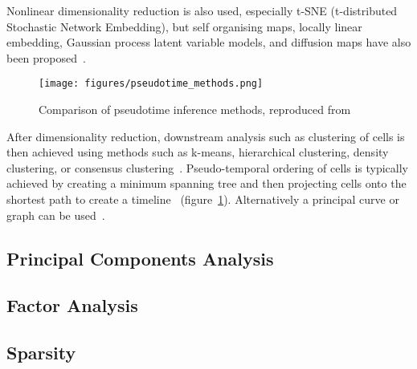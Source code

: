 Nonlinear dimensionality reduction is also used, especially t-SNE (t-distributed Stochastic Network Embedding), but self organising maps, locally linear embedding, Gaussian process latent variable models, and diffusion maps have also been proposed~\cite{Kim2015SingleCell,Welch2016SLICER,Haghverdi2015Diffusion,Campbell2015Bayesian}.

\begin{figure}[H]
	\centering
	\texttt{[image: figures/pseudotime\_methods.png]}
	\caption{Comparison of pseudotime inference methods, reproduced from~\cite{Cannoodt2016Computational}}
	\label{fig:pseudotime_methods}
\end{figure}

After dimensionality reduction, downstream analysis such as clustering of cells is then achieved using methods such as k-means, hierarchical clustering, density clustering, or consensus clustering~\cite{Zurauskiene2016pcaReduce,Kiselev2017SC3,Guo2015SINCERA,Satija2015Spatial}. Pseudo-temporal ordering of cells is typically achieved by creating a minimum spanning tree and then projecting cells onto the shortest path to create a timeline~\cite{Trapnell2014dynamics,Ji2016TSCAN} (figure~\ref{fig:pseudotime_methods}). Alternatively a principal curve or graph can be used~\cite{Marco2014Bifurcation,Qiu2017Reversed}.




\subsection{Principal Components Analysis}

\subsection{Factor Analysis}

\subsection{Sparsity}

